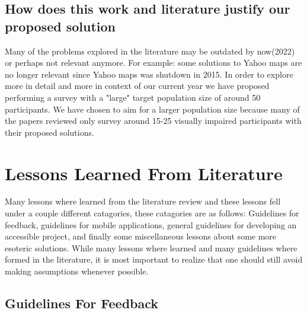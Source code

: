 \documentclass{article}
\begin{document}
\subsection{How does this work and literature justify our proposed solution}
Many of the problems explored in the literature may be outdated by now(2022) or perhaps not relevant anymore. For example: some solutions to Yahoo maps are no longer relevant since Yahoo maps was shutdown in 2015. In order to explore more in detail and more in context of our current year we have proposed performing a survey with a "large" target population size of around 50 participants. We have chosen to aim for a larger population size because many of the papers reviewed only survey around 15-25 visually impaired participants with their proposed solutions.


\section{Lessons Learned From Literature}

Many lessons where learned from the literature review and these lessons fell under a couple different catagories, these catagories are as follows: Guidelines for feedback, guidelines for mobile applications, general guidelines for developing an accessible project, and finally some miscellaneous lessons about some more esoteric solutions. While many lessons where learned and many guidelines where formed in the literature, it is most important to realize that one should still avoid making assumptions whenever possible.

\subsection{Guidelines For Feedback}
\end{document}
